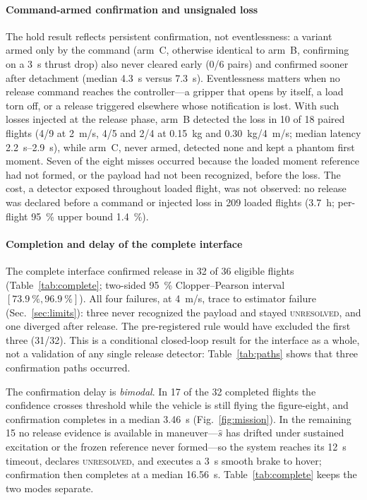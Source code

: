 \paragraph{Command-armed confirmation and unsignaled loss}
The hold result reflects persistent confirmation, not eventlessness: a variant armed only by the
command (arm~C, otherwise identical to arm~B, confirming on a \SI{3}{s} thrust drop) also never
cleared early (0/6 pairs) and confirmed sooner after detachment (median \SI{4.3}{s} versus
\SI{7.3}{s}). Eventlessness matters when no release command reaches the controller---a gripper
that opens by itself, a load torn off, or a release triggered elsewhere whose notification is
lost. With such losses injected at the release phase, arm~B detected the loss in 10 of 18 paired
flights (4/9 at \SI{2}{m/s}, 4/5 and 2/4 at \SI{0.15}{kg} and \SI{0.30}{kg}/\SI{4}{m/s}; median
latency \SIrange{2.2}{2.9}{s}), while arm~C, never armed, detected none and kept a phantom first
moment. Seven of the eight misses occurred because the loaded moment reference had not formed,
or the payload had not been recognized, before the loss. The cost, a detector exposed throughout loaded flight, was not observed: no release was
declared before a command or injected loss in 209 loaded flights (\SI{3.7}{h}; per-flight
\SI{95}{\percent} upper bound \SI{1.4}{\percent}).

\paragraph{Completion and delay of the complete interface}
The complete interface confirmed release in 32 of 36 eligible flights (Table~\ref{tab:complete};
two-sided \SI{95}{\percent} Clopper--Pearson interval
$[\SI{73.9}{\percent},\SI{96.9}{\percent}]$). All four failures, at \SI{4}{m/s}, trace to estimator failure
(Sec.~\ref{sec:limits}): three never recognized the payload and stayed \textsc{unresolved}, and
one diverged after release. The pre-registered rule would have excluded the first three
(31/32). This is a
conditional closed-loop result for the interface as a whole, not a validation of any single
release detector: Table~\ref{tab:paths} shows that three confirmation paths occurred.

The confirmation delay is \emph{bimodal}. In 17 of the 32 completed flights the confidence
crosses threshold while the vehicle is still flying the figure-eight, and confirmation completes
in a median \SI{3.46}{s} (Fig.~\ref{fig:mission}). In the remaining 15 no release
evidence is available in maneuver---$\hat s$ has drifted under sustained excitation or the frozen
reference never formed---so the system reaches its \SI{12}{s} timeout, declares
\textsc{unresolved}, and executes a \SI{3}{s} smooth brake to hover; confirmation then completes
at a median \SI{16.56}{s}. Table~\ref{tab:complete} keeps the two modes separate.

